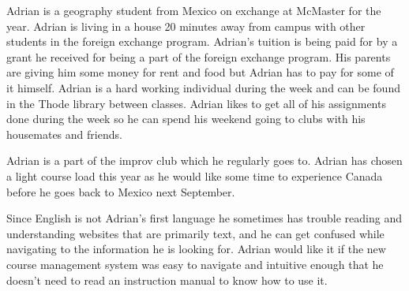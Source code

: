 \documentclass[10pt]{article}
\begin{document}
Adrian is a geography student from Mexico on exchange at McMaster for the year. Adrian is living in a house 20 minutes away from campus with other students in the foreign exchange program. Adrian's tuition is being paid for by a grant he received for being a part of the foreign exchange program. His parents are giving him some money for rent and food but Adrian has to pay for some of it himself. Adrian is a hard working individual during the week and can be found in the Thode library between classes. Adrian likes to get all of his assignments done during the week so he can spend his weekend going to clubs with his housemates and friends.

Adrian is a part of the improv club which he regularly goes to. Adrian has chosen a light course load this year as he would like some time to experience Canada before he goes back to Mexico next September.

Since English is not Adrian's first language he sometimes has trouble reading and understanding websites that are primarily text, and he can get confused while navigating to the information he is looking for. Adrian would like it if the new course management system was easy to navigate and intuitive enough that he doesn't need to read an instruction manual to know how to use it.
\end{document}
